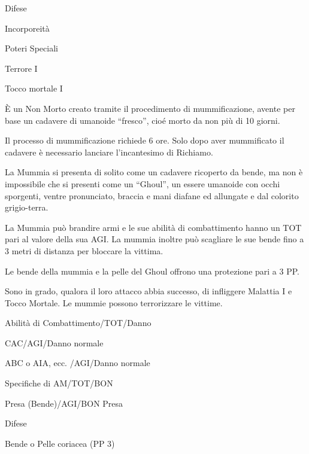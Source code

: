 \begin{parmostro}{Difese}
\item Incorporeit\`a
\end{parmostro}

\begin{parmostro}{Poteri Speciali}
\item Terrore I
\item Tocco mortale I
\end{parmostro}



\`E un Non Morto creato tramite il procedimento di mummificazione,
avente per base un cadavere di umanoide ``fresco'', cio\'e morto da
non pi\`u di 10 giorni.

Il processo di mummificazione richiede 6 ore. Solo dopo aver
mummificato il cadavere \`e necessario lanciare l'incantesimo di
Richiamo.

La Mummia si presenta di solito come un cadavere ricoperto da bende,
ma non \`e impossibile che si presenti come un ``Ghoul'', un essere
umanoide con occhi sporgenti, ventre pronunciato, braccia e mani
diafane ed allungate e dal colorito grigio-terra. 

La Mummia pu\`o brandire armi e le sue abilit\`a di combattimento
hanno un TOT pari al valore della sua AGI. La mummia inoltre pu\`o
scagliare le sue bende fino a 3 metri di distanza per bloccare la
vittima.  

Le bende della mummia e la pelle del Ghoul offrono una
protezione pari a 3 PP.  

Sono in grado, qualora il loro attacco abbia successo, di infliggere
Malattia I e Tocco Mortale. Le mummie possono terrorizzare le vittime.


\begin{parmostro}{Abilit\`a di Combattimento/TOT/Danno}
\item CAC/AGI/Danno normale
\item ABC o AIA, ecc.  /AGI/Danno normale
\end{parmostro}

\begin{parmostro}{Specifiche di AM/TOT/BON}
\item Presa (Bende)/AGI/BON Presa
\end{parmostro}

\begin{parmostro}{Difese}
\item Bende o Pelle coriacea (PP 3)
\end{parmostro}

